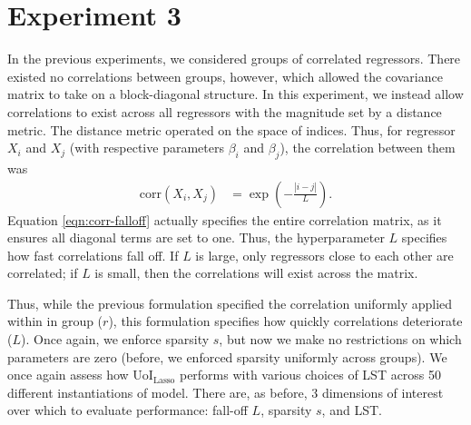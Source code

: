 \documentclass[11pt]{article}
\begin{document}
\section{Experiment 3}
In the previous experiments, we considered groups of correlated regressors. There existed no correlations between groups, however, which allowed the covariance matrix to take on a block-diagonal structure. In this experiment, we instead allow correlations to exist across all regressors with the magnitude set by a distance metric. The distance metric operated on the space of indices. Thus, for regressor $X_i$ and $X_j$ (with respective parameters $\beta_i$ and $\beta_j$), the correlation between them was 
\begin{align}
	\text{corr}(X_i, X_j) &= \exp\left(-\frac{|i-j|}{L}\right). \label{eqn:corr-falloff}
\end{align}
Equation \ref{eqn:corr-falloff} actually specifies the entire correlation matrix, as it ensures all diagonal terms are set to one. Thus, the hyperparameter $L$ specifies how fast correlations fall off. If $L$ is large, only regressors close to each other are correlated; if $L$ is small, then the correlations will exist across the matrix. 

Thus, while the previous formulation specified the correlation uniformly applied within in group ($r$), this formulation specifies how quickly correlations deteriorate ($L$). Once again, we enforce sparsity $s$, but now we make no restrictions on which parameters are zero (before, we enforced sparsity uniformly across groups). We once again assess how UoI$_{\text{Lasso}}$ performs with various choices of LST across 50 different instantiations of model. There are, as before, 3 dimensions of interest over which to evaluate performance: fall-off $L$, sparsity $s$, and LST. 
\end{document}
